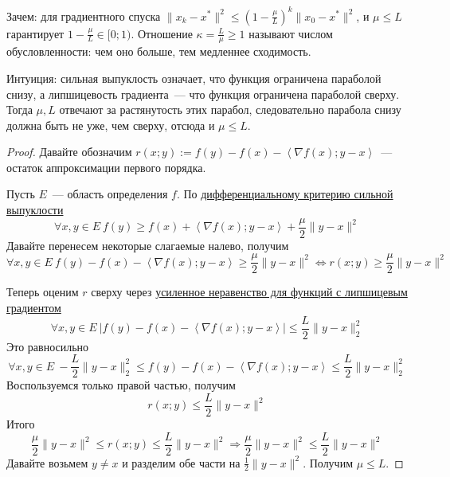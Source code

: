 

\begin{remark}
  Зачем: для градиентного спуска $\| x_k - x^{*} \|^2 \le \left( 1 - \frac{\mu}{L} \right)^k \| x_0 - x^{*} \|^2$, и $\mu \le L$ гарантирует $1 - \frac{\mu}{L} \in [0;1)$. Отношение $\kappa = \frac{L}{\mu} \ge 1$ называют числом обусловленности: чем оно больше, тем медленнее сходимость.
\end{remark}

\begin{remark}
  Интуиция: сильная выпуклость означает, что функция ограничена параболой снизу, а липшицевость градиента~--- что функция ограничена параболой сверху. Тогда $\mu,L$ отвечают за растянутость этих парабол, следовательно парабола снизу должна быть не уже, чем сверху, отсюда и $\mu \le L$.
\end{remark}

\begin{proof}
  Давайте обозначим $r(x;y) := f(y) - f(x) - \left\langle \nabla f(x); y-x \right\rangle$~--- остаток аппроксимации первого порядка.

  Пусть $E$~--- область определения $f$.
  По \hyperref[note:1B5A3E25-56E8-4D5E-9CF6-E2731DA77604]{дифференциальному критерию сильной выпуклости}
  \[
  \forall x,y \in E\ f(y) \ge f(x) + \left\langle \nabla f(x); y -x \right\rangle + \frac{\mu}{2} \| y -x \|^2
  \]
  Давайте перенесем некоторые слагаемые налево, получим
  \[
  \forall x,y \in E\ f(y) - f(x) - \left\langle \nabla f(x); y -x \right\rangle \ge \frac{\mu}{2} \| y -x \|^2
  \Leftrightarrow r(x;y) \ge \frac{\mu}{2} \|y-x\|^2
  \]

  Теперь оценим $r$ сверху через \hyperref[note:379E4CAD-A44B-4631-8DAF-F3DC708EAEDE]{усиленное неравенство для функций с липшицевым градиентом}
  \[
  \forall x,y \in E\ \left| f(y) -f(x) - \left\langle \nabla f(x); y-x  \right\rangle \right|\le \frac{L}{2} \| y - x\|^2_2
  \]
  Это равносильно
  \[
  \forall x,y \in E\ - \frac{L}{2} \| y - x\|^2_2 \le  f(y) -f(x) - \left\langle \nabla f(x); y-x  \right\rangle \le \frac{L}{2} \| y - x\|^2_2
  \]
  Воспользуемся только правой частью, получим
  \[
  r(x;y) \le \frac{L}{2} \| y-x \|^2
  \]
  Итого
  \[
  \frac{\mu}{2} \| y-x \|^2 \le r(x;y) \le \frac{L}{2} \| y-x\|^2 \Rightarrow \frac{\mu}{2} \| y-x\|^2 \le \frac{L}{2} \|y-x\|^2
  \]
  Давайте возьмем $y \ne x$ и разделим обе части на $\frac{1}{2} \| y-x \|^2$.
  Получим $\mu \le L$.
\end{proof}
